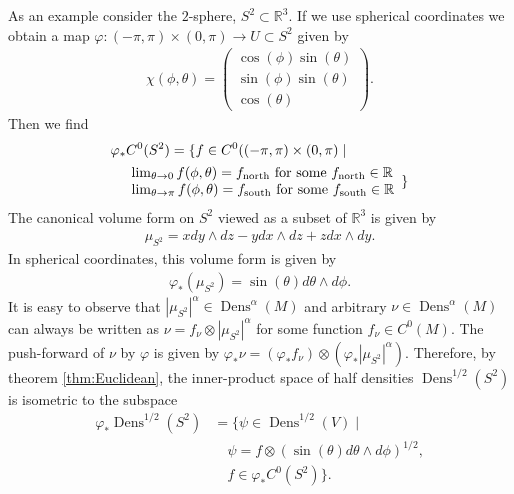 \documentclass[letterpaper, 10 pt, conference]{ieeeconf}
\newcommand{\R}{\mathbb{R}}
\DeclareMathOperator{\Dens}{Dens}
\begin{document}

  As an example consider the $2$-sphere, $S^2 \subset \R^3$.
  If we use spherical coordinates we obtain a map
  $\varphi: (-\pi,\pi) \times (0,\pi) \to U \subset S^2$
  given by
  \begin{align*}
    \chi(\phi,\theta) = \begin{pmatrix}
      \cos(\phi) \sin(\theta) \\
      \sin(\phi) \sin(\theta) \\
      \cos(\theta)
      \end{pmatrix}.
  \end{align*}
  Then we find
  \begin{align*}
    &\varphi_*C^0(S^2) = \{
      f \in C^0( (-\pi,\pi)\times (0,\pi) \mid \\
    &\quad \begin{array}{l}
      \lim_{\theta \to 0} f(\phi,\theta) = f_{\rm north} \text{ for some } f_{\rm north} \in \R \\
      \lim_{\theta \to \pi} f(\phi,\theta) = f_{\rm south} \text{ for some } f_{\rm south} \in \R 
    \end{array}
    \}
  \end{align*}
  The canonical volume form on $S^2$ viewed as a subset of $\R^3$ is 
  given by
  \begin{align*}
    \mu_{S^2} = x dy \wedge dz - y dx \wedge dz + z dx \wedge dy.
  \end{align*}
  In spherical coordinates, this volume form is given by
  \begin{align*}
    \varphi_*(\mu_{S^2}) = \sin(\theta) d\theta \wedge d\phi.
  \end{align*}
  It is easy to observe that $|\mu_{S^2}|^\alpha \in \Dens^\alpha(M)$
  and arbitrary $\nu \in \Dens^\alpha(M)$ can always be written
  as $\nu = f_{\nu} \otimes |\mu_{S^2}|^\alpha$ for some function 
  $f_\nu \in C^0(M)$.
  The push-forward of $\nu$ by $\varphi$ is given by
  $\varphi_*\nu = (\varphi_*f_\nu) \otimes (\varphi_*|\mu_{S^2}|^\alpha)$.
  Therefore, by theorem \ref{thm:Euclidean},
  the inner-product space of half densities $\Dens^{1/2}(S^2)$
  is isometric to the subspace
  \begin{align*}
    \varphi_* \Dens^{1/2}(S^2) &= \{ \psi \in \Dens^{1/2}(V) \mid \\
    & \quad \psi = f \otimes  (\sin(\theta) d\theta \wedge d\phi)^{1/2} ,\\
    & \quad f \in \varphi_*C^0(S^2) \}.
  \end{align*}
\end{document}
